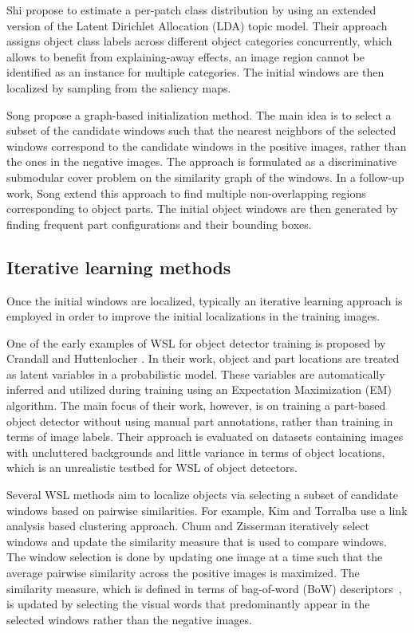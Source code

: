 \documentclass[10pt,journal,cspaper,final,twocolumn,compsoc]{./IEEEtran}
\begin{document}
Shi \etal\cite{shi13iccv} propose to estimate a per-patch class
distribution by using an extended version of the Latent
Dirichlet Allocation (LDA) \cite{blei03jmlr} topic model.
Their approach assigns object class labels across
different object categories concurrently, which allows to
benefit from explaining-away effects, \ie an image region
cannot be identified as an instance for multiple
categories. The initial windows are then localized by
sampling from the saliency maps.

Song \etal\cite{song14icml} propose a graph-based
initialization method.  The main idea is to select a
subset of the candidate windows such that the nearest
neighbors of the selected windows correspond 
to the candidate windows in the positive images, rather
than the ones in the negative images. The approach is
formulated as a discriminative submodular cover problem on
the similarity graph of the 
windows. In a follow-up work, Song \etal\cite{song14nips} extend this approach to find
multiple non-overlapping regions corresponding to object
parts.  The initial object windows are then generated by
finding frequent part configurations and their bounding
boxes. 

\subsection{Iterative learning methods}\label{sec:related_reloc}

Once the initial windows are localized, typically an
iterative learning approach is employed in order to
improve the initial localizations in the training images.

One of the early examples of WSL for object detector
training is proposed by Crandall and Huttenlocher \cite{crandall06eccv}.
In their work, object and part locations are treated as
latent variables in a probabilistic model.  These
variables are automatically inferred and utilized during
training using an  Expectation Maximization (EM)
algorithm. The main focus of their work, however, is
 on training a part-based object detector without
using manual part annotations, rather than training in
terms of image labels. Their approach is
evaluated on datasets containing images with
uncluttered backgrounds and little variance in terms of
object locations, which is an unrealistic testbed for
WSL of object detectors.

Several WSL methods aim to localize objects via selecting
a subset of candidate windows based on pairwise
similarities.  For example, Kim and Torralba
\cite{kim09nips} use a  link analysis based
clustering approach.  Chum and Zisserman \cite{chum07cvpr}
iteratively select windows and update the similarity
measure that is used to compare windows.  The window
selection is done by updating one image at a time such
that the average pairwise similarity across the positive
images is maximized. The similarity measure, which is
defined in terms of bag-of-word (BoW) descriptors~\cite{dance04eccv}, is updated by
selecting the visual words that predominantly appear in
the selected windows rather than the negative images.  
\end{document}
